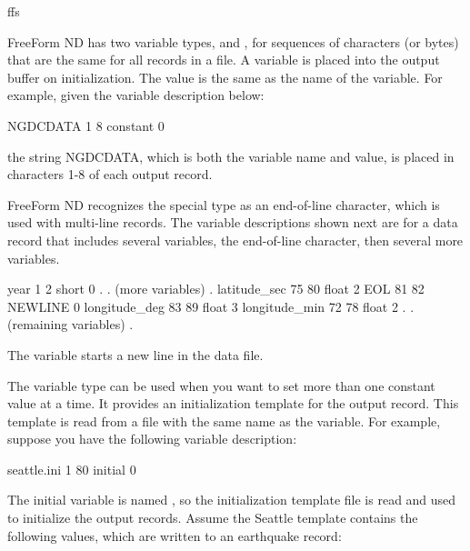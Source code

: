 \begin{description}
\begin{ifclear}{ffs}
\item[\lit{constant}]
  
  FreeForm ND has two variable types,  and
  , for sequences of characters (or bytes) that are the
  same for all records in a file. A  variable is placed
  into the output buffer on initialization. The  value
  is the same as the name of the variable. For example, given the
  variable description below:

\begin{example}
NGDCDATA 1 8 constant 0 
\end{example}

the string NGDCDATA, which is both the variable name and value, is
placed in characters 1-8 of each output record.

FreeForm ND recognizes the special  type 
as an end-of-line character, which is used with multi-line records.
The variable descriptions shown next are for a data record that
includes several variables, the end-of-line character, then several
more variables.

\begin{example}
year 1 2 short 0
       .
       .   (more variables)
       .
latitude_sec 75 80 float 2
EOL 81 82 NEWLINE 0
longitude_deg 83 89 float 3
longitude_min 72 78 float 2
       .
       .   (remaining variables)
       . 
\end{example}

The variable  starts a new line in the data file. 

\item[\lit{initial}]
  
  The variable type  can be used when you want to set
  more than one constant value at a time. It provides an
  initialization template for the output record. This template is read
  from a file with the same name as the  variable. For
  example, suppose you have the following variable description:

\begin{example}
seattle.ini 1 80 initial 0 
\end{example}

The initial variable is named , so the initialization
template file  is read and used to initialize the
output records. Assume the Seattle template contains the following
values, which are written to an earthquake record:


\end{ifclear}
\end{description}
